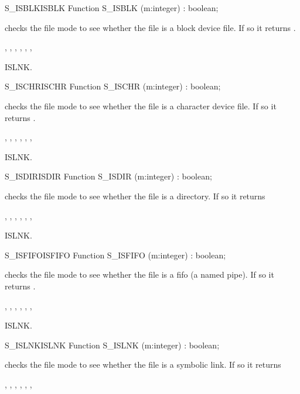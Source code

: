\begin{functionl}{S\_ISBLK}{ISBLK}
\Declaration
Function S\_ISBLK (m:integer) : boolean;

\Description
  checks the file mode  to see whether the file is a
block device file. If so it returns .

\Errors
{},
 , 
 ,
 ,
 ,
 ,

\SeeAlso
ISLNK.
\end{functionl}
\begin{functionl}{S\_ISCHR}{ISCHR}
\Declaration
Function S\_ISCHR (m:integer) : boolean;

\Description
  checks the file mode  to see whether the file is a
character device file. If so it returns .

\Errors
{},
 , 
 ,
 ,
 ,
 ,

\SeeAlso
ISLNK.
\end{functionl}
\begin{functionl}{S\_ISDIR}{ISDIR}
\Declaration
Function S\_ISDIR (m:integer) : boolean;

\Description
  checks the file mode  to see whether the file is a
directory. If so it returns 

\Errors
{},
 , 
 ,
 ,
 ,
 ,

\SeeAlso
ISLNK.
\end{functionl}
\begin{functionl}{S\_ISFIFO}{ISFIFO}
\Declaration
Function S\_ISFIFO (m:integer) : boolean;

\Description
  checks the file mode  to see whether the file is a
fifo (a named pipe). If so it returns .

\Errors
{},
 , 
 ,
 ,
 ,
 ,

\SeeAlso
ISLNK.
\end{functionl}
\begin{functionl}{S\_ISLNK}{ISLNK}
\Declaration
Function S\_ISLNK (m:integer) : boolean;

\Description
  checks the file mode  to see whether the file is a
symbolic link. If so it returns 

\Errors
{},
 ,
 ,
 ,
 ,
 ,

\SeeAlso
{}
\end{functionl}
